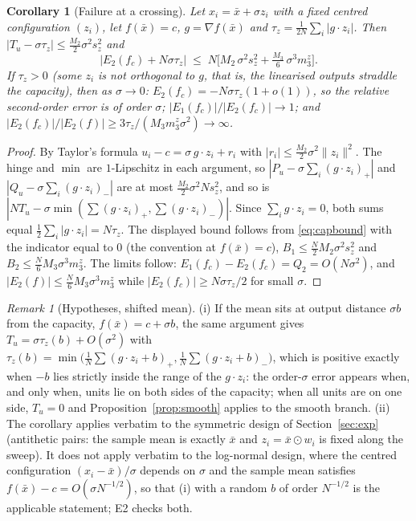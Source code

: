 \documentclass[10pt,a4paper]{article}
\theoremstyle{plain}
\newtheorem{corollary}[theorem]{Corollary}
\theoremstyle{definition}
\theoremstyle{remark}
\newtheorem{remark}[theorem]{Remark}
\newcommand{\Tu}{T_u}
\begin{document}
\begin{corollary}[Failure at a crossing]\label{cor:cross}
Let $x_i=\bar x+\sigma z_i$ with a fixed centred configuration $(z_i)$, let $f(\bar x)=c$, $g=\nabla f(\bar x)$ and $\tau_z=\frac1{2N}\sum_i|g\cdot z_i|$. Then $|\Tu-\sigma\tau_z|\le\frac{M_2}{2}\sigma^2s_z^2$ and
\[
\big|E_2(f_c)+N\sigma\tau_z\big|\;\le\;N\Big[M_2\,\sigma^2s_z^2+\tfrac{M_3}{6}\,\sigma^3m_3^z\Big].
\]
If $\tau_z>0$ (some $z_i$ is not orthogonal to $g$, that is, the linearised outputs straddle the capacity), then as $\sigma\to0$: $E_2(f_c)=-N\sigma\tau_z(1+o(1))$, so the relative second-order error is of order $\sigma$; $|E_1(f_c)|/|E_2(f_c)|\to1$; and $|E_2(f_c)|/|E_2(f)|\ge 3\tau_z/(M_3m_3^z\sigma^2)\to\infty$.
\end{corollary}
\begin{proof}
By Taylor's formula $u_i-c=\sigma\,g\cdot z_i+r_i$ with $|r_i|\le\frac{M_2}2\sigma^2\|z_i\|^2$. The hinge and $\min$ are $1$-Lipschitz in each argument, so $|P_u-\sigma\sum_i(g\cdot z_i)_+|$ and $|Q_u-\sigma\sum_i(g\cdot z_i)_-|$ are at most $\frac{M_2}2\sigma^2Ns_z^2$, and so is $|N\Tu-\sigma\min(\sum(g\cdot z_i)_+,\sum(g\cdot z_i)_-)|$. Since $\sum_ig\cdot z_i=0$, both sums equal $\frac12\sum_i|g\cdot z_i|=N\tau_z$. The displayed bound follows from \eqref{eq:capbound} with the indicator equal to $0$ (the convention at $f(\bar x)=c$), $B_1\le\frac N2M_2\sigma^2s_z^2$ and $B_2\le\frac N6M_3\sigma^3m_3^z$. The limits follow: $E_1(f_c)-E_2(f_c)=Q_2=O(N\sigma^2)$, and $|E_2(f)|\le\frac N6M_3\sigma^3m_3^z$ while $|E_2(f_c)|\ge N\sigma\tau_z/2$ for small $\sigma$.
\end{proof}

\begin{remark}[Hypotheses, shifted mean]\label{rem:hyp}
(i) If the mean sits at output distance $\sigma b$ from the capacity, $f(\bar x)=c+\sigma b$, the same argument gives $\Tu=\sigma\tau_z(b)+O(\sigma^2)$ with $\tau_z(b)=\min\big(\frac1N\sum(g\cdot z_i+b)_+,\frac1N\sum(g\cdot z_i+b)_-\big)$, which is positive exactly when $-b$ lies strictly inside the range of the $g\cdot z_i$: the order-$\sigma$ error appears when, and only when, units lie on both sides of the capacity; when all units are on one side, $\Tu=0$ and Proposition~\ref{prop:smooth} applies to the smooth branch. (ii) The corollary applies verbatim to the symmetric design of Section~\ref{sec:exp} (antithetic pairs: the sample mean is exactly $\bar x$ and $z_i=\bar x\odot w_i$ is fixed along the sweep). It does not apply verbatim to the log-normal design, where the centred configuration $(x_i-\bar x)/\sigma$ depends on $\sigma$ and the sample mean satisfies $f(\bar x)-c=O(\sigma N^{-1/2})$, so that (i) with a random $b$ of order $N^{-1/2}$ is the applicable statement; E2 checks both.
\end{remark}
\end{document}
